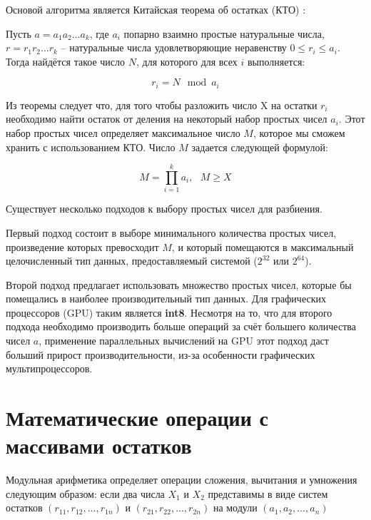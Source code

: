 \documentclass[10pt]{article}
\begin{document}
Основой алгоритма является Китайская теорема об остатках (КТО) \cite{Okulov2011,Cormen2001}:

Пусть $a = a_1 a_2 ... a_k$, где $a_i$ попарно взаимно простые натуральные числа, $r = r_1 r_2 ... r_k$ -- натуральные числа удовлетворяющие неравенству $0 \leq r_i \le a_i$. Тогда найдётся такое число
$N$, для которого для всех $i$ выполняется:

\begin{equation}
	r_i=N \mod a_i
	\label{eq:rem_th}
\end{equation}

Из теоремы следует что, для того чтобы разложить число X на остатки $r_i$ необходимо найти остаток от деления на некоторый набор простых чисел $a_i$. Этот набор простых чисел определяет максимальное число $M$, которое мы сможем хранить с использованием КТО. Число $M$ задается следующей формулой:

\begin{equation}
	M = \prod\limits_{i=1}^k a_i, ~~~ M \geqslant X
	\label{eq:corollary}
\end{equation}

Существует несколько подходов к выбору простых чисел для разбиения. 

Первый подход состоит в выборе минимального количества простых чисел, произведение которых превосходит $M$, и который помещаются в максимальный целочисленный тип данных, предоставляемый системой ($2^{32}$ или $2^{64}$). 

Второй подход предлагает использовать множество простых чисел, которые бы помещались в наиболее производительный тип данных. Для графических процессоров (GPU) таким является \textbf{int8}. Несмотря на то, что для второго подхода необходимо производить больше операций за счёт большего количества чисел $a$, применение параллельных вычислений на GPU этот подход даст больший прирост производительности, из-за особенности графических мультипроцессоров.

\section{Математические операции с массивами остатков}

Модульная арифметика \cite{omondi2007residue, soderstrand1986residue} определяет операции сложения, вычитания и умножения следующим образом: если два числа $X_1$ и $X_2$ представимы в виде систем остатков $(r_{11}, r_{12}, ..., r_{1n}) $ и $(r_{21}, r_{22}, ..., r_{2n})$ на модули $(a_1, a_2, ..., a_n)$
\end{document}
